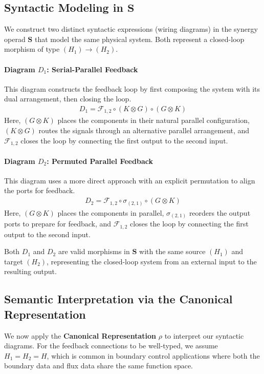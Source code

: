 \documentclass[11pt]{article}
\begin{document}
\subsection{Syntactic Modeling in $\mathbf{S}$}

We construct two distinct syntactic expressions (wiring diagrams) in the synergy operad $\mathbf{S}$ that model the same physical system. Both represent a closed-loop morphism of type $(H_1) \to (H_2)$.

\paragraph{Diagram $D_1$: Serial-Parallel Feedback}
This diagram constructs the feedback loop by first composing the system with its dual arrangement, then closing the loop.
\begin{align*}
    D_1 = \mathcal{F}_{1,2} \circ (K \otimes G) \circ (G \otimes K)
\end{align*}
Here, $(G \otimes K)$ places the components in their natural parallel configuration, $(K \otimes G)$ routes the signals through an alternative parallel arrangement, and $\mathcal{F}_{1,2}$ closes the loop by connecting the first output to the second input.

\paragraph{Diagram $D_2$: Permuted Parallel Feedback}
This diagram uses a more direct approach with an explicit permutation to align the ports for feedback.
\begin{align*}
    D_2 = \mathcal{F}_{1,2} \circ \sigma_{(2,1)} \circ (G \otimes K)
\end{align*}
Here, $(G \otimes K)$ places the components in parallel, $\sigma_{(2,1)}$ reorders the output ports to prepare for feedback, and $\mathcal{F}_{1,2}$ closes the loop by connecting the first output to the second input.

Both $D_1$ and $D_2$ are valid morphisms in $\mathbf{S}$ with the same source $(H_1)$ and target $(H_2)$, representing the closed-loop system from an external input to the resulting output.

\subsection{Semantic Interpretation via the Canonical Representation}

We now apply the \textbf{Canonical Representation} $\rho$ to interpret our syntactic diagrams. For the feedback connections to be well-typed, we assume $H_1 = H_2 = H$, which is common in boundary control applications where both the boundary data and flux data share the same function space.
\end{document}

